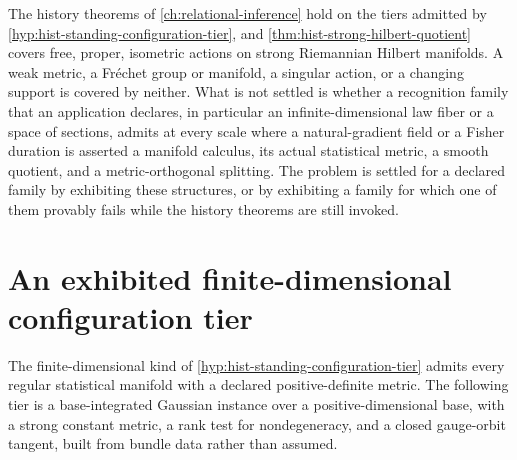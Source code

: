 The history theorems of \cref{ch:relational-inference} hold on the tiers
admitted by \cref{hyp:hist-standing-configuration-tier}, and
\cref{thm:hist-strong-hilbert-quotient} covers free, proper, isometric actions on
strong Riemannian Hilbert manifolds. A weak metric, a Fr\'echet group or
manifold, a singular action, or a changing support is covered by neither. What
is not settled is whether a recognition family that an application declares, in
particular an infinite-dimensional law fiber or a space of sections, admits at
every scale where a natural-gradient field or a Fisher duration is asserted a
manifold calculus, its actual statistical metric, a smooth quotient, and a
metric-orthogonal splitting. The problem is settled for a declared family by
exhibiting these structures, or by exhibiting a family for which one of them
provably fails while the history theorems are still invoked.

\section{An exhibited finite-dimensional configuration tier}

The finite-dimensional kind of \cref{hyp:hist-standing-configuration-tier}
admits every regular statistical manifold with a declared positive-definite
metric. The following tier is a base-integrated Gaussian instance over a
positive-dimensional base, with a strong constant metric, a rank test for
nondegeneracy, and a closed gauge-orbit tangent, built from bundle data rather
than assumed.


